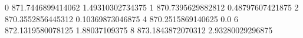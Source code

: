 0 871.7446899414062 1.49310302734375
1 870.7395629882812 0.48797607421875
2 870.3552856445312 0.10369873046875
4 870.2515869140625 0.0
6 872.1319580078125 1.88037109375
8 873.1843872070312 2.93280029296875
